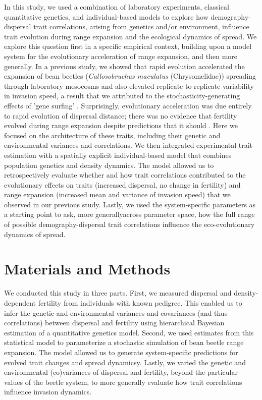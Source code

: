 In this study, we used a combination of laboratory experiments, classical quantitative genetics, and individual-based models to explore how demography-dispersal trait correlations, arising from genetics and/or environment, influence trait evolution during range expansion and the ecological dynamics of spread. We explore this question first in a specific empirical context, building upon a model system for the evolutionary acceleration of range expansion, and then more generally. In a previous study, we showed that rapid evolution accelerated the expansion of bean beetles (\textit{Callosobruchus maculatus} (Chrysomelidae)) spreading through laboratory mesocosms and also elevated replicate-to-replicate variability in invasion speed, a result that we attributed to the stochasticity-generating effects of 'gene surfing' \citep{ochocki_rapid_2017}. Surprisingly, evolutionary acceleration was due entirely to rapid evolution of dispersal distance; there was no evidence that fertility evolved during range expansion despite predictions that it should \citep{ochocki_rapid_2017}. Here we focused on the architecture of these traits, including their genetic and environmental variances and correlations. We then integrated experimental trait estimation with a spatially explicit individual-based model that combines population genetics and density dynamics. The model allowed us to retrospectively evaluate whether and how trait correlations contributed to the evolutionary effects on traits (increased dispersal, no change in fertility) and range expansion (increased mean and variance of invasion speed) that we observed in our previous study. Lastly, we used the system-specific parameters as a starting point to ask, more generallyacross parameter space, how the full range of possible demography-dispersal trait correlations influence the eco-evolutionary dynamics of spread.

\section{Materials and Methods}

We conducted this study in three parts. First, we measured dispersal and density-dependent fertility from individuals with known pedigree. This enabled us to infer the genetic and environmental variances and covariances (and thus correlations) between dispersal and fertility using hierarchical Bayesian estimation of a quantitative genetics model. Second, we used estimates from this statistical model to parameterize a stochastic simulation of bean beetle range expansion. The model allowed us to generate system-specific predictions for evolved trait changes and spread dynamicsy. Lastly, we varied the genetic and environmental (co)variances of dispersal and fertility, beyond the particular values of the beetle system, to more generally evaluate how trait correlations influence invasion dynamics.

